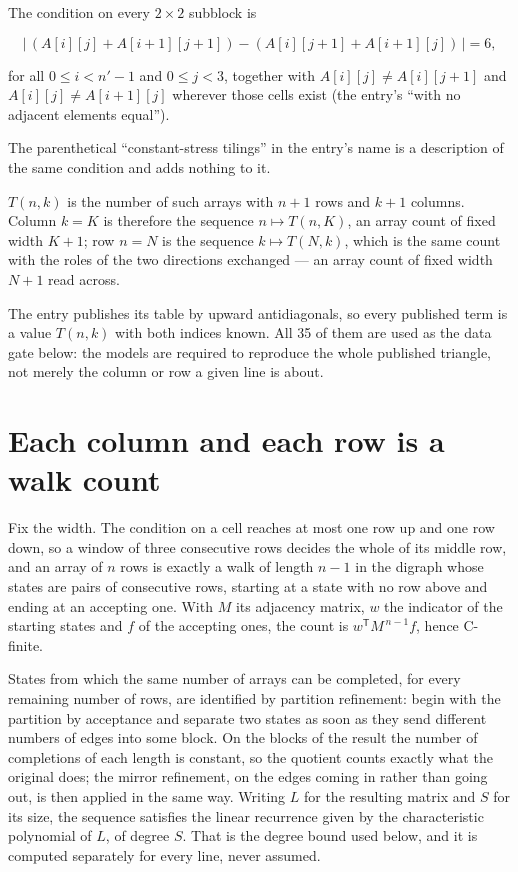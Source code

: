\documentclass[11pt]{article}
\theoremstyle{definition}
\begin{document}
The condition on every $2 \times 2$ subblock is

\[\bigl|\,(A[i][j] + A[i{+}1][j{+}1]) - (A[i][j{+}1] + A[i{+}1][j])\,\bigr| = 6,\]

for all $0 \le i < n'-1$ and $0 \le j < 3$, together with $A[i][j] \ne A[i][j{+}1]$ and $A[i][j] \ne A[i{+}1][j]$ wherever those cells exist (the entry's ``with no adjacent elements equal'').

The parenthetical ``constant-stress tilings'' in the entry's name is a description of the same condition and adds nothing to it.

$T(n,k)$ is the number of such arrays with $n + 1$ rows and $k + 1$ columns. Column $k = K$ is therefore the sequence $n \mapsto T(n,K)$, an array count of fixed width $K + 1$; row $n = N$ is the sequence $k \mapsto T(N,k)$, which is the same count with the roles of the two directions exchanged --- an array count of fixed width $N + 1$ read across.

The entry publishes its table by upward antidiagonals, so every published term is a value $T(n,k)$ with both indices known. All 35 of them are used as the data gate below: the models are required to reproduce the whole published triangle, not merely the column or row a given line is about.

\section{Each column and each row is a walk count}

Fix the width. The condition on a cell reaches at most one row up and one row down, so a window of three consecutive rows decides the whole of its middle row, and an array of $n$ rows is exactly a walk of length $n-1$ in the digraph whose states are pairs of consecutive rows, starting at a state with no row above and ending at an accepting one. With $M$ its adjacency matrix, $w$ the indicator of the starting states and $f$ of the accepting ones, the count is $w^{\mathsf T}M^{\,n-1}f$, hence C-finite.

States from which the same number of arrays can be completed, for every remaining number of rows, are identified by partition refinement: begin with the partition by acceptance and separate two states as soon as they send different numbers of edges into some block. On the blocks of the result the number of completions of each length is constant, so the quotient counts exactly what the original does; the mirror refinement, on the edges coming in rather than going out, is then applied in the same way. Writing $L$ for the resulting matrix and $S$ for its size, the sequence satisfies the linear recurrence given by the characteristic polynomial of $L$, of degree $S$. That is the degree bound used below, and it is computed separately for every line, never assumed.
\end{document}
